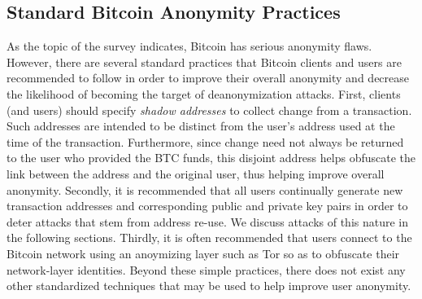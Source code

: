 \subsection{Standard Bitcoin Anonymity Practices}
As the topic of the survey indicates, Bitcoin has serious anonymity flaws. However, there are several standard practices that Bitcoin clients and users are recommended to follow in order to improve their overall anonymity and decrease the likelihood of becoming the target of deanonymization attacks. First, clients (and users) should specify \emph{shadow addresses} to collect change from a transaction. Such addresses are intended to be distinct from the user's address used at the time of the transaction. Furthermore, since change need not always be returned to the user who provided the BTC funds, this disjoint address helps obfuscate the link between the address and the original user, thus helping improve overall anonymity. Secondly, it is recommended that all users continually generate new transaction addresses and corresponding public and private key pairs in order to deter attacks that stem from address re-use. We discuss attacks of this nature in the following sections. Thirdly, it is often recommended that users connect to the Bitcoin network using an anoymizing layer such as Tor \cite{bitcoin-tor-wiki} so as to obfuscate their network-layer identities. Beyond these simple practices, there does not exist any other standardized techniques that may be used to help improve user anonymity.

